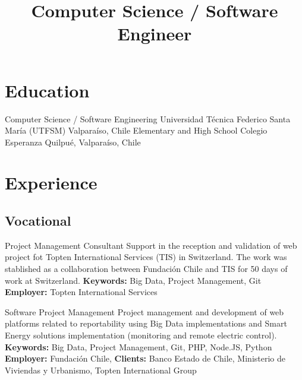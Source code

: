 \documentclass[11pt,a4paper,sans]{moderncv}
\title{Computer Science / Software Engineer}
\begin{document}
\maketitle




\section{Education}

        {Computer Science / Software Engineering}
        {Universidad Técnica Federico Santa María (UTFSM)}
        {Valparaíso, Chile}
        {}
        {}
        {Elementary and High School}
        {Colegio Esperanza}
        {Quilpué, Valparaíso, Chile}
        {}{}

\section{Experience}
\subsection{Vocational}

        {Project Management Consultant}
        {Support in the reception and validation of web project fot Topten International Services (TIS) in Switzerland. The work was stablished as a collaboration between Fundación Chile and TIS for 50 days of work at Switzerland.}
        {\textbf{Keywords:} Big Data, Project Management, Git}
        {\textbf{Employer:} Topten International Services}
        {}

        {Software Project Management}
        {Project management and development of web platforms related to reportability using Big Data implementations and Smart Energy solutions implementation (monitoring and remote electric control).}
        {\textbf{Keywords:} Big Data, Project Management, Git, PHP, Node.JS, Python}
        {\textbf{Employer:} Fundación Chile, \textbf{Clients:} Banco Estado de Chile, Ministerio de Viviendas y Urbanismo, Topten International Group}
        {}
\end{document}
